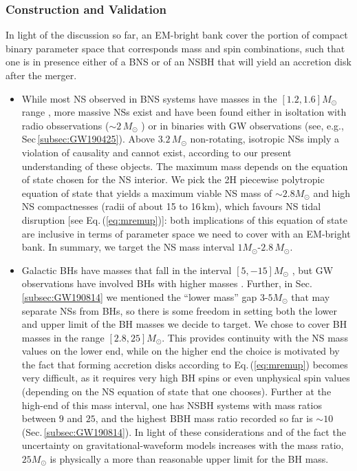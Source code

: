 \documentclass[binding=0.6cm, LaM]{sapthesis}
\begin{document}
\subsubsection{Construction and Validation}
\label{subsec:construction_and_validation}
	In light of the discussion so far, an EM-bright bank cover the portion of compact binary parameter space that
        corresponds mass and spin combinations, such that one is in presence either of a BNS or of an NSBH that will yield an accretion disk after the merger.
        \begin{itemize}
        \item While most NS observed in BNS systems have masses in the $[1.2, 1.6]M_{\odot}$ range \cite{87},
          more massive NSs exist and have been found either in isoltation with radio obsservations ($\sim 2\,M_{\odot}$ \cite{87}) or in binaries with GW observations (see, e.g., Sec\,\ref{subsec:GW190425}).  Above $3.2\,M_\odot$ non-rotating, isotropic NSs imply a violation of causality and cannot exist, according to our present understanding of these objects.
          The maximum mass depends on the equation of state chosen for the NS interior.  We pick the 2H piecewise polytropic equation of state \cite{170} that yields a maximum viable NS mass of $\sim 2.8M_\odot$ and high NS compactnesses (radii of about 15 to 16\,km), which favours NS tidal disruption [see Eq.\,(\ref{eq:mremup})]: both implications of this equation of state are inclusive in terms of parameter space we need to cover with an EM-bright bank.
          In summary, we target the NS mass interval $1M_\odot$-$2.8\,M_\odot$.
        \item Galactic BHs have masses that fall in the interval $[5,-15]M_{\odot}$ \cite{124},
          but GW observations have involved BHs with higher masses \cite{49}.
          Further, in Sec.\,\ref{subsec:GW190814} we mentioned the ``lower mass'' gap $3$-$5M_\odot$ that may separate NSs from BHs, so there is some freedom in setting both the lower and upper limit of the BH masses we decide to target.
          We chose to cover BH masses in the range $[2.8,25]M_\odot$.
          This provides continuity with the NS mass values on the lower end, while on the higher end the choice is motivated by the fact that forming accretion disks according to Eq.\,(\ref{eq:mremup}) becomes very difficult, as it requires very high BH spins or even unphysical spin values (depending on the NS equation of state that one chooses).  Further at the high-end of this mass interval, one has NSBH systems with mass ratios between $9$ and $25$, and the highest BBH mass ratio recorded so far is $\sim 10$ (Sec.\,\ref{subsec:GW190814}).  In light of these considerations and of the fact the uncertainty on gravitational-waveform models increases with the mass ratio, $25M_\odot$ is physically a more than reasonable upper limit for the BH mass.

\end{itemize}
\end{document}
